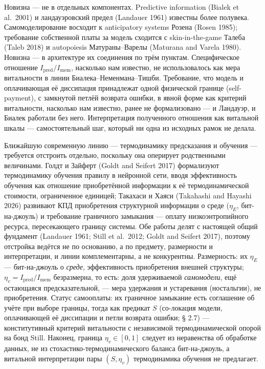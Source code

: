 \documentclass[pdflatex,sn-mathphys-ay]{sn-jnl}
\begin{document}
Новизна --- не в отдельных компонентах. Predictive information (Bialek et al.~2001) и ландауэровский предел (Landauer 1961) известны более полувека. Самомоделирование восходит к anticipatory systems Розена (Rosen 1985); требование собственной платы за модель сходится с skin-in-the-game Талеба (Taleb 2018) и autopoiesis Матураны--Варелы (Maturana and Varela 1980). Новизна --- в архитектуре их соединения по трём пунктам. Специфическое отношение \(I_{\text{pred}}/I_{\text{mem}}\), насколько нам известно, не использовалось как мера витальности в линии Биалека--Неменмана--Тишби. Требование, что модель и оплачивающая её диссипация принадлежат одной физической границе (self-payment), с замкнутой петлёй возврата ошибки, в явной форме как критерий витальности, насколько нам известно, ранее не формализовано --- и Ландауэр, и Биалек работали без него. Интерпретация полученного отношения как витальной шкалы --- самостоятельный шаг, который ни одна из исходных рамок не делала.

Ближайшую современную линию --- термодинамику предсказания и обучения --- требуется отстроить отдельно, поскольку она оперирует родственными величинами. Голдт и Зайферт (Goldt and Seifert 2017) формализуют термодинамику обучения правилу в нейронной сети, вводя эффективность обучения как отношение приобретённой информации к её термодинамической стоимости, ограниченное единицей; Такахаси и Хаяси (Takahashi and Hayashi 2026) развивают КПД приобретения структурной информации о среде (\(\eta_E\), бит-на-джоуль) и требование граничного замыкания --- оплату низкоэнтропийного ресурса, пересекающего границу системы. Обе работы делят с настоящей общий фундамент (Landauer 1961; Still et al.~2012; Goldt and Seifert 2017), поэтому отстройка ведётся не по основанию, а по предмету, размерности и интерпретации, и линии комплементарны, а не конкурентны. Размерность: их \(\eta_E\) --- бит-на-джоуль о \emph{среде}, эффективность приобретения внешней структуры; \(\eta_v = I_{\text{pred}}/I_{\text{mem}}\) безразмерна, то есть: доля удерживаемой \emph{самомодели}, ещё остающаяся предсказательной, --- мера удержания и устаревания (ностальгии), не приобретения. Статус самооплаты: их граничное замыкание есть соглашение об учёте при выборе границы, тогда как предикат \(S\) (со-локация модели, оплачивающей её диссипации и петли возврата ошибки; § 2.7) --- конститутивный критерий витальности с независимой термодинамической опорой на бонд Still. Наконец, граница \(\eta_v \in [0, 1]\) следует из неравенства об обработке данных, не из стохастико-термодинамического баланса бит-на-джоуль, а витальной интерпретации пары \((S, \eta_v)\) термодинамика обучения не предлагает.
\end{document}
